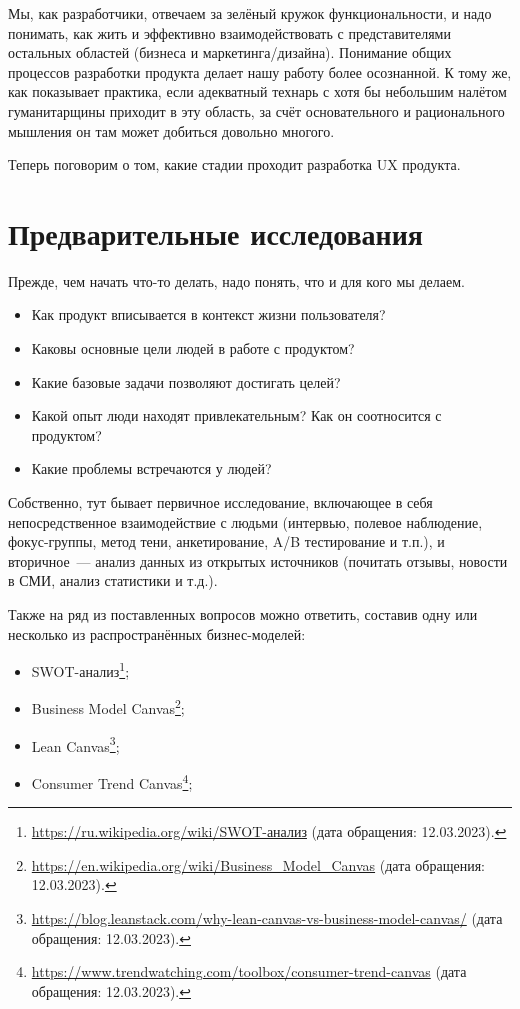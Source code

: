 \documentclass{../../text-style}
\begin{document}
Мы, как разработчики, отвечаем за зелёный кружок функциональности, и надо понимать, как жить и эффективно взаимодействовать с представителями остальных областей (бизнеса и маркетинга/дизайна). Понимание общих процессов разработки продукта делает нашу работу более осознанной. К тому же, как показывает практика, если адекватный технарь с хотя бы небольшим налётом гуманитарщины приходит в эту область, за счёт основательного и рационального мышления он там может добиться довольно многого.

Теперь поговорим о том, какие стадии проходит разработка UX продукта.

\section{Предварительные исследования}

Прежде, чем начать что-то делать, надо понять, что и для кого мы делаем.

\begin{itemize}
    \item Как продукт вписывается в контекст жизни пользователя? 
    \item Каковы основные цели людей в работе с продуктом? 
    \item Какие базовые задачи позволяют достигать целей? 
    \item Какой опыт люди находят привлекательным? Как он соотносится с продуктом?
    \item Какие проблемы встречаются у людей?
\end{itemize}

Собственно, тут бывает первичное исследование, включающее в себя непосредственное взаимодействие с людьми (интервью, полевое наблюдение, фокус-группы, метод тени, анкетирование, A/B тестирование и т.п.), и вторичное~--- анализ данных из открытых источников (почитать отзывы, новости в СМИ, анализ статистики и т.д.).

Также на ряд из поставленных вопросов можно ответить, составив одну или несколько из распространённых бизнес-моделей:

\begin{itemize}
    \item SWOT-анализ\footnote{\url{https://ru.wikipedia.org/wiki/SWOT-анализ} (дата обращения: 12.03.2023).};
    \item Business Model Canvas\footnote{\url{https://en.wikipedia.org/wiki/Business_Model_Canvas} (дата обращения: 12.03.2023).};
    \item Lean Canvas\footnote{\url{https://blog.leanstack.com/why-lean-canvas-vs-business-model-canvas/} (дата обращения: 12.03.2023).};
    \item Consumer Trend Canvas\footnote{\url{https://www.trendwatching.com/toolbox/consumer-trend-canvas} (дата обращения: 12.03.2023).};
\end{itemize}
\end{document}
